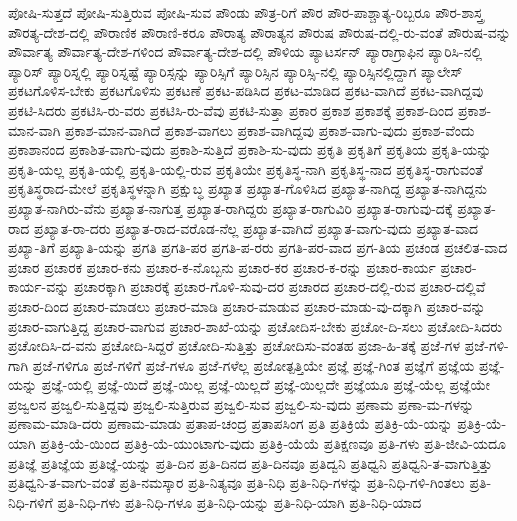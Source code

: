 {ಪೋಷಿ-ಸುತ್ತದೆ
ಪೋಷಿ-ಸುತ್ತಿರುವ
ಪೋಷಿ-ಸುವ
ಪೌಂಡು
ಪೌತ್ರ-ರಿಗೆ
ಪೌರ
ಪೌರ-ಪಾಶ್ಚಾತ್ಯ-ರಿಬ್ಬರೂ
ಪೌರ-ಶಾಸ್ತ್ರ
ಪೌರತ್ಯ-ದೇಶ-ದಲ್ಲಿ
ಪೌರಾಣಿಕ
ಪೌರಾಣಿ-ಕರೂ
ಪೌರಾತ್ಯ
ಪೌರಾತ್ಯನ
ಪೌರುಷ
ಪೌರುಷ-ದಲ್ಲಿ-ರು-ವಂತೆ
ಪೌರುಷ-ವನ್ನು
ಪೌರ್ವಾತ್ಯ
ಪೌರ್ವಾತ್ಯ-ದೇಶ-ಗಳಿಂದ
ಪೌರ್ವಾತ್ಯ-ದೇಶ-ದಲ್ಲಿ
ಪೌಳಿಯ
ಪ್ಯಾಟರ್ಸನ್
ಪ್ಯಾರಾಗ್ರಾಫಿನ
ಪ್ಯಾರಿಸಿ-ನಲ್ಲಿ
ಪ್ಯಾರಿಸ್
ಪ್ಯಾರಿಸ್ನಲ್ಲಿ
ಪ್ಯಾರಿಸ್ನಷ್ಟೆ
ಪ್ಯಾರಿಸ್ಸನ್ನು
ಪ್ಯಾರಿಸ್ಸಿಗೆ
ಪ್ಯಾರಿಸ್ಸಿನ
ಪ್ಯಾರಿಸ್ಸಿ-ನಲ್ಲಿ
ಪ್ಯಾರಿಸ್ಸಿನಲ್ಲಿದ್ದಾಗ
ಪ್ಯಾಲೇಸ್
ಪ್ರಕಟಗೊಳಿಸ-ಬೇಕು
ಪ್ರಕಟಗೊಳಿಸು
ಪ್ರಕಟಣೆ
ಪ್ರಕಟ-ಪಡಿಸಿದ
ಪ್ರಕಟ-ಮಾಡಿದ
ಪ್ರಕಟ-ವಾಗಿದೆ
ಪ್ರಕಟ-ವಾಗಿದ್ದವು
ಪ್ರಕಟಿ-ಸಿದರು
ಪ್ರಕಟಿಸಿ-ರು-ವರು
ಪ್ರಕಟಿಸಿ-ರು-ವೆವು
ಪ್ರಕಟಿ-ಸುತ್ತಾ
ಪ್ರಕಾರ
ಪ್ರಕಾಶ
ಪ್ರಕಾಶಕ್ಕೆ
ಪ್ರಕಾಶ-ದಿಂದ
ಪ್ರಕಾಶ-ಮಾನ-ವಾಗಿ
ಪ್ರಕಾಶ-ಮಾನ-ವಾಗಿದೆ
ಪ್ರಕಾಶ-ವಾಗಲು
ಪ್ರಕಾಶ-ವಾಗಿದ್ದವು
ಪ್ರಕಾಶ-ವಾಗು-ವುದು
ಪ್ರಕಾಶ-ವೆಂದು
ಪ್ರಕಾಶಾನಂದ
ಪ್ರಕಾಶಿತ-ವಾಗು-ವುದು
ಪ್ರಕಾಶಿ-ಸುತ್ತಿದೆ
ಪ್ರಕಾಶಿ-ಸು-ವುದು
ಪ್ರಕೃತಿ
ಪ್ರಕೃತಿಗೆ
ಪ್ರಕೃತಿಯ
ಪ್ರಕೃತಿ-ಯನ್ನು
ಪ್ರಕೃತಿ-ಯಲ್ಲ
ಪ್ರಕೃತಿ-ಯಲ್ಲಿ
ಪ್ರಕೃತಿ-ಯಲ್ಲಿ-ರುವ
ಪ್ರಕೃತಿಯೇ
ಪ್ರಕೃತಿಸ್ಥ-ನಾಗಿ
ಪ್ರಕೃತಿಸ್ಥ-ನಾದ
ಪ್ರಕೃತಿಸ್ಥ-ರಾಗುವಂತೆ
ಪ್ರಕೃತಿಸ್ಥರಾದ-ಮೇಲೆ
ಪ್ರಕೃತಿಸ್ಥಳನ್ನಾಗಿ
ಪ್ರಕ್ಷುಬ್ಧ
ಪ್ರಖ್ಯಾತ
ಪ್ರಖ್ಯಾತ-ಗೊಳಿಸಿದ
ಪ್ರಖ್ಯಾತ-ನಾಗಿದ್ದ
ಪ್ರಖ್ಯಾತ-ನಾಗಿದ್ದನು
ಪ್ರಖ್ಯಾತ-ನಾಗಿರು-ವೆನು
ಪ್ರಖ್ಯಾತ-ನಾಗುತ್ತ
ಪ್ರಖ್ಯಾತ-ರಾಗಿದ್ದರು
ಪ್ರಖ್ಯಾತ-ರಾಗುವಿರಿ
ಪ್ರಖ್ಯಾತ-ರಾಗುವು-ದಕ್ಕೆ
ಪ್ರಖ್ಯಾತ-ರಾದ
ಪ್ರಖ್ಯಾತ-ರಾ-ದರು
ಪ್ರಖ್ಯಾತ-ರಾದ-ವರೊಡ-ನೆಲ್ಲ
ಪ್ರಖ್ಯಾತ-ವಾಗಿದೆ
ಪ್ರಖ್ಯಾತ-ವಾಗು-ವುದು
ಪ್ರಖ್ಯಾತ-ವಾದ
ಪ್ರಖ್ಯಾ-ತಿಗೆ
ಪ್ರಖ್ಯಾತಿ-ಯನ್ನು
ಪ್ರಗತಿ
ಪ್ರಗತಿ-ಪರ
ಪ್ರಗತಿ-ಪ-ರರು
ಪ್ರಗತಿ-ಪರ-ವಾದ
ಪ್ರಗ-ತಿಯ
ಪ್ರಚಂಡ
ಪ್ರಚಲಿತ-ವಾದ
ಪ್ರಚಾರ
ಪ್ರಚಾರಕ
ಪ್ರಚಾರ-ಕನು
ಪ್ರಚಾರ-ಕ-ನೊಬ್ಬನು
ಪ್ರಚಾರ-ಕರ
ಪ್ರಚಾರ-ಕ-ರನ್ನು
ಪ್ರಚಾರ-ಕಾರ್ಯ
ಪ್ರಚಾರ-ಕಾರ್ಯ-ವನ್ನು
ಪ್ರಚಾರಕ್ಕಾಗಿ
ಪ್ರಚಾರಕ್ಕೆ
ಪ್ರಚಾರ-ಗೊಳಿ-ಸುವು-ದರ
ಪ್ರಚಾರದ
ಪ್ರಚಾರ-ದಲ್ಲಿ-ರುವ
ಪ್ರಚಾರ-ದಲ್ಲಿವೆ
ಪ್ರಚಾರ-ದಿಂದ
ಪ್ರಚಾರ-ಮಾಡಲು
ಪ್ರಚಾರ-ಮಾಡಿ
ಪ್ರಚಾರ-ಮಾಡುವ
ಪ್ರಚಾರ-ಮಾಡು-ವು-ದಕ್ಕಾಗಿ
ಪ್ರಚಾರ-ವನ್ನು
ಪ್ರಚಾರ-ವಾಗುತ್ತಿದ್ದ
ಪ್ರಚಾರ-ವಾಗುವ
ಪ್ರಚಾರ-ಶಾಖೆ-ಯನ್ನು
ಪ್ರಚೋದಿಸ-ಬೇಕು
ಪ್ರಚೋ-ದಿ-ಸಲು
ಪ್ರಚೋದಿ-ಸಿದರು
ಪ್ರಚೋದಿಸಿ-ದ-ವನು
ಪ್ರಚೋದಿ-ಸಿದ್ದರೆ
ಪ್ರಚೋದಿ-ಸುತ್ತಿತ್ತು
ಪ್ರಚೋದಿಸು-ವಂತಹ
ಪ್ರಜಾ-ಹಿ-ತಕ್ಕೆ
ಪ್ರಜೆ-ಗಳ
ಪ್ರಜೆ-ಗಳಿ-ಗಾಗಿ
ಪ್ರಜೆ-ಗಳಿಗೂ
ಪ್ರಜೆ-ಗಳಿಗೆ
ಪ್ರಜೆ-ಗಳೂ
ಪ್ರಜೆ-ಗಳೆಲ್ಲ
ಪ್ರಜೋತ್ಪತ್ತಿಯೇ
ಪ್ರಜ್ಞೆ
ಪ್ರಜ್ಞೆ-ಗಿಂತ
ಪ್ರಜ್ಞೆಗೆ
ಪ್ರಜ್ಞೆಯ
ಪ್ರಜ್ಞೆ-ಯನ್ನು
ಪ್ರಜ್ಞೆ-ಯಲ್ಲಿ
ಪ್ರಜ್ಞೆ-ಯಿದೆ
ಪ್ರಜ್ಞೆ-ಯಿಲ್ಲ
ಪ್ರಜ್ಞೆ-ಯಿಲ್ಲದೆ
ಪ್ರಜ್ಞೆ-ಯಿಲ್ಲದೇ
ಪ್ರಜ್ಞೆಯೂ
ಪ್ರಜ್ಞೆ-ಯೆಲ್ಲ
ಪ್ರಜ್ಞೆಯೇ
ಪ್ರಜ್ವಲನ
ಪ್ರಜ್ವಲಿ-ಸುತ್ತಿದ್ದವು
ಪ್ರಜ್ವಲಿ-ಸುತ್ತಿರುವ
ಪ್ರಜ್ವಲಿ-ಸುವ
ಪ್ರಜ್ವಲಿ-ಸು-ವುದು
ಪ್ರಣಾಮ
ಪ್ರಣಾ-ಮ-ಗಳನ್ನು
ಪ್ರಣಾಮ-ಮಾಡಿ-ದರು
ಪ್ರಣಾಮ-ಮಾಡು
ಪ್ರತಾಪ-ಚಂದ್ರ
ಪ್ರತಾಪಸಿಂಗ
ಪ್ರತಿ
ಪ್ರತಿಕ್ರಿಯೆ
ಪ್ರತಿಕ್ರಿ-ಯೆ-ಯನ್ನು
ಪ್ರತಿಕ್ರಿ-ಯೆ-ಯಾಗಿ
ಪ್ರತಿಕ್ರಿ-ಯೆ-ಯಿಂದ
ಪ್ರತಿಕ್ರಿ-ಯೆ-ಯುಂಟಾಗು-ವುದು
ಪ್ರತಿಕ್ರಿ-ಯೆಯೆ
ಪ್ರತಿಕ್ಷಣವೂ
ಪ್ರತಿ-ಗಳು
ಪ್ರತಿ-ಜೀವಿ-ಯದೂ
ಪ್ರತಿಜ್ಞೆ
ಪ್ರತಿಜ್ಞೆಯ
ಪ್ರತಿಜ್ಞೆ-ಯನ್ನು
ಪ್ರತಿ-ದಿನ
ಪ್ರತಿ-ದಿನದ
ಪ್ರತಿ-ದಿನವೂ
ಪ್ರತಿದ್ವನಿ
ಪ್ರತಿಧ್ವನಿ
ಪ್ರತಿಧ್ವನಿ-ತ-ವಾಗುತ್ತಿತ್ತು
ಪ್ರತಿಧ್ವನಿ-ತ-ವಾಗು-ವಂತೆ
ಪ್ರತಿ-ನಮಸ್ಕಾರ
ಪ್ರತಿ-ನಿತ್ಯವೂ
ಪ್ರತಿ-ನಿಧಿ
ಪ್ರತಿ-ನಿಧಿ-ಗಳನ್ನು
ಪ್ರತಿ-ನಿಧಿ-ಗಳಿ-ಗಿಂತಲು
ಪ್ರತಿ-ನಿಧಿ-ಗಳಿಗೆ
ಪ್ರತಿ-ನಿಧಿ-ಗಳು
ಪ್ರತಿ-ನಿಧಿ-ಗಳೂ
ಪ್ರತಿ-ನಿಧಿ-ಯನ್ನು
ಪ್ರತಿ-ನಿಧಿ-ಯಾಗಿ
ಪ್ರತಿ-ನಿಧಿ-ಯಾದ
}
